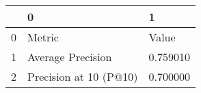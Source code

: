 \begin{tabular}{lll}
\toprule
 & 0 & 1 \\
\midrule
0 & Metric & Value \\
1 & Average Precision & 0.759010 \\
2 & Precision at 10 (P@10) & 0.700000 \\
\bottomrule
\end{tabular}
